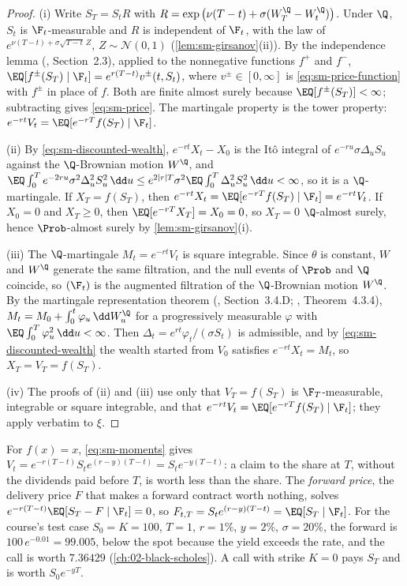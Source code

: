 \begin{proof}
(i) Write $S_T=S_tR$ with $R=\exp\big(\nu(T-t)+\sigma(W^\Q_T-W^\Q_t)\big)$. Under $\Q$, $S_t$ is
$\F_t$-measurable and $R$ is independent of $\F_t$, with the law of
$e^{\nu(T-t)+\sigma\sqrt{T-t}\,Z}$, $Z\sim\mathcal N(0,1)$ (\cref{lem:sm-girsanov}(ii)). By the
independence lemma (\textcite{shreve2}, Section~2.3), applied to the nonnegative functions $f^+$
and $f^-$, $\EQ[f^\pm(S_T)\mid\F_t]=e^{r(T-t)}v^\pm(t,S_t)$, where $v^\pm\in[0,\infty]$ is
\eqref{eq:sm-price-function} with $f^\pm$ in place of $f$. Both are finite almost surely because
$\EQ[f^\pm(S_T)]<\infty$; subtracting gives \eqref{eq:sm-price}. The martingale property is the
tower property: $e^{-rt}V_t=\EQ[e^{-rT}f(S_T)\mid\F_t]$.

(ii) By \eqref{eq:sm-discounted-wealth}, $e^{-rt}X_t-X_0$ is the It\^o integral of
$e^{-ru}\sigma\Delta_uS_u$ against the $\Q$-Brownian motion $W^\Q$, and
$\EQ\int_0^Te^{-2ru}\sigma^2\Delta_u^2S_u^2\,\dd u\le e^{2|r|T}\sigma^2\EQ\int_0^T\Delta_u^2S_u^2\,\dd u<\infty$,
so it is a $\Q$-martingale. If $X_T=f(S_T)$, then
$e^{-rt}X_t=\EQ[e^{-rT}f(S_T)\mid\F_t]=e^{-rt}V_t$. If $X_0=0$ and $X_T\ge0$, then
$\EQ[e^{-rT}X_T]=X_0=0$, so $X_T=0$ $\Q$-almost surely, hence $\Prob$-almost surely by
\cref{lem:sm-girsanov}(i).

(iii) The $\Q$-martingale $M_t=e^{-rt}V_t$ is square integrable. Since $\theta$ is constant, $W$
and $W^\Q$ generate the same filtration, and the null events of $\Prob$ and $\Q$ coincide, so
$(\F_t)$ is the augmented filtration of the $\Q$-Brownian motion $W^\Q$. By the martingale
representation theorem (\textcite{karatzas-shreve}, Section~3.4.D; \textcite{oksendal},
Theorem~4.3.4), $M_t=M_0+\int_0^t\varphi_u\,\dd W^\Q_u$ for a progressively measurable $\varphi$
with $\EQ\int_0^T\varphi_u^2\,\dd u<\infty$. Then $\Delta_t=e^{rt}\varphi_t/(\sigma S_t)$ is
admissible, and by \eqref{eq:sm-discounted-wealth} the wealth started from $V_0$ satisfies
$e^{-rt}X_t=M_t$, so $X_T=V_T=f(S_T)$.

(iv) The proofs of (ii) and (iii) use only that $V_T=f(S_T)$ is $\F_T$-measurable, integrable or
square integrable, and that $e^{-rt}V_t=\EQ[e^{-rT}f(S_T)\mid\F_t]$; they apply verbatim to $\xi$.
\end{proof}

\begin{remark}\label{rem:sm-forward}
For $f(x)=x$, \eqref{eq:sm-moments} gives $V_t=e^{-r(T-t)}S_te^{(r-y)(T-t)}=S_te^{-y(T-t)}$: a
claim to the share at $T$, without the dividends paid before $T$, is worth less than the share.
The \emph{forward price}, the delivery price $F$ that makes a forward contract worth nothing, solves
$e^{-r(T-t)}\EQ[S_T-F\mid\F_t]=0$, so $F_{t,T}=S_te^{(r-y)(T-t)}=\EQ[S_T\mid\F_t]$. For the course's
test case $S_0=K=100$, $T=1$, $r=1\%$, $y=2\%$, $\sigma=20\%$, the forward is
$100\,e^{-0.01}=99.005$, below the spot because the yield exceeds the rate, and the call is worth
$7.36429$ (\cref{ch:02-black-scholes}). A call with strike $K=0$ pays $S_T$ and is worth
$S_0e^{-yT}$.
\end{remark}

